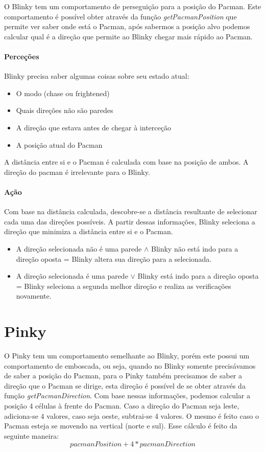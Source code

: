 \documentclass[12pt]{article}
\begin{document}
O Blinky tem um comportamento de perseguição para a posição do Pacman. Este comportamento é possível obter através da função \textit{getPacmanPosition} que permite ver saber onde está o Pacman, após sabermos a posição alvo podemos calcular qual é a direção que permite ao Blinky chegar mais rápido ao Pacman.

\paragraph*{Perceções}

Blinky precisa saber algumas coisas sobre seu estado atual:

\begin{itemize}
    \item O modo (chase ou frightened)
    \item Quais direções não são paredes
    \item A direção que estava antes de chegar à interceção
    \item A posição atual do Pacman
\end{itemize}

A distância entre si e o Pacman é calculada com base na posição de ambos. A direção do pacman é irrelevante para o Blinky.

\paragraph*{Ação} 
Com base na distância calculada, descobre-se a distância resultante de selecionar cada uma das direções possíveis. A partir dessas informações, Blinky seleciona a direção que minimiza a distância entre si e o Pacman.

\begin{itemize}
    \item A direção selecionada não é uma parede $\land$ Blinky não está indo para a direção oposta = Blinky altera sua direção para a selecionada.
    
    \item A direção selecionada é uma parede $\lor$ Blinky está indo para a direção oposta = Blinky seleciona a segunda melhor direção e realiza as verificações novamente.
\end{itemize}

\section*{Pinky}
O Pinky tem um comportamento semelhante ao Blinky, porém este possui um comportamento de emboscada, ou seja, quando no Blinky somente precisávamos de saber a posição do Pacman, para o Pinky também precisamos de saber a direção que o Pacman se dirige, esta direção é possível de se obter através da função \textit{getPacmanDirection}. Com base nessas informações, podemos calcular a posição 4 células à frente do Pacman. Caso a direção do Pacman seja leste, adiciona-se 4 valores, caso seja oeste, subtrai-se 4 valores. O mesmo é feito caso o Pacman esteja se movendo na vertical (norte e sul). Esse cálculo é feito da seguinte maneira: 
\[ pacmanPosition + 4 * pacmanDirection\]
\end{document}
